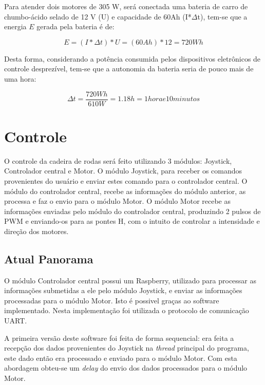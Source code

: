   Para atender dois motores de 305 W, será conectada uma bateria de carro de chumbo-ácido selado de 12 V (U) e capacidade de 60Ah (I*$\Delta$t), tem-se que a energia $E$ gerada pela bateria é de:

  \begin{equation}
  E = (I*\Delta t)*U = (60Ah)*12 = 720Wh
  \end{equation}

  Desta forma, considerando a potência consumida pelos dispositivos eletrônicos de controle desprezível, tem-se que a autonomia da bateria seria de pouco mais de uma hora:

  \begin{equation}
  \Delta t = \frac{720 Wh}{610 W} = 1.18 h = 1 hora e 10 minutos
  \end{equation}

\section{Controle}

  O controle da cadeira de rodas será feito utilizando 3 módulos: Joystick, Controlador central e Motor.
  O módulo Joystick, para receber os comandos provenientes do usuário e enviar estes comando para o controlador central. O módulo do controlador central, recebe as informações do módulo anterior, as processa e faz o envio para o módulo Motor. O módulo Motor recebe as informações enviadas pelo módulo do controlador central, produzindo 2 pulsos de PWM e enviando-os para as pontes H, com o intuito de controlar a intensidade e direção dos motores.

\subsection{Atual Panorama}

  O módulo Controlador central possui um Raspberry, utilizado para processar as informações submetidas a ele pelo módulo Joystick, e enviar as informações processadas para o módulo Motor. Isto é possivel graças ao software implementado. Nesta implementação foi utilizada o protocolo de comunicação UART.

  A primeira versão deste software foi feita de forma sequencial: era feita a recepção dos dados provenientes do Joystick na \textit{thread} principal do programa, este dado então era processado e enviado para o módulo Motor. Com esta abordagem obteu-se um \textit{delay} do envio dos dados processados para o módulo Motor.

